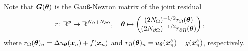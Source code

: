 
Note that ${\bm{G}}({\bm{\theta}})$ is the Gauß-Newton matrix of the joint residual 
\begin{equation*}
    r\colon\mathbb R^p\to\mathbb R^{N_\Omega+N_{\partial\Omega}}, \quad 
    {\bm{\theta}} 
    \mapsto 
    \begin{pmatrix}
        (2N_\Omega)^{-1/2}r_\Omega({\bm{\theta}}) \\ 
        (2N_{\partial\Omega})^{-1/2}r_{\partial\Omega}({\bm{\theta}})
    \end{pmatrix},
\end{equation*}
where $r_{\Omega}({\bm{\theta}})_n = \Delta u_{\bm{\theta}}({\bm{x}}_n) + f({\bm{x}}_n)$ and $r_{\Omega}({\bm{\theta}})_n = u_{\bm{\theta}}({\bm{x}}_n^b) - g({\bm{x}}_n^b)$, respectively. 

